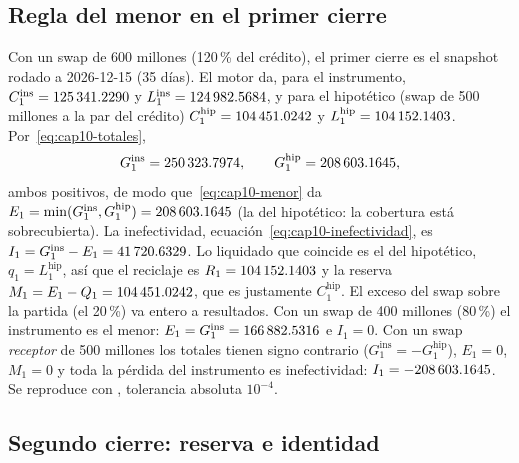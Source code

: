 \subsection{Regla del menor en el primer cierre}

Con un swap de 600 millones (120\,\% del crédito), el primer cierre es el snapshot rodado a 2026-12-15 (35 días). El
motor da, para el instrumento, $C^{\mathrm{ins}}_1=\verif{cap10-inst-cum-1}{125341.2290}$ y
$L^{\mathrm{ins}}_1=\verif{cap10-liq-inst-1}{124982.5684}$, y para el hipotético (swap de 500 millones a la par del
crédito) $C^{\mathrm{hip}}_1=\verif{cap10-hypo-cum-1}{104451.0242}$ y
$L^{\mathrm{hip}}_1=\verif{cap10-liq-hip-1}{104152.1403}$. Por~\eqref{eq:cap10-totales},
\[
  G^{\mathrm{ins}}_1 = \verif{cap10-inst-total}{250323.7974}, \qquad
  G^{\mathrm{hip}}_1 = \verif{cap10-hypo-total}{208603.1645},
\]
ambos positivos, de modo que~\eqref{eq:cap10-menor} da $E_1=\min(G^{\mathrm{ins}}_1,G^{\mathrm{hip}}_1)=
\verif{cap10-efectiva}{208603.1645}$ (la del hipotético: la cobertura está sobrecubierta). La inefectividad,
ecuación~\eqref{eq:cap10-inefectividad}, es $I_1 = G^{\mathrm{ins}}_1 - E_1 = \verif{cap10-inefectividad}{41720.6329}$.
Lo liquidado que coincide es el del hipotético, $q_1 = L^{\mathrm{hip}}_1$, así que el reciclaje es
$R_1=\verif{cap10-reciclaje-1}{104152.1403}$ y la reserva $M_1 = E_1 - Q_1 =
\verif{cap10-reserva-1}{104451.0242}$, que es justamente $C^{\mathrm{hip}}_1$. El exceso del swap sobre la partida
(el 20\,\%) va entero a resultados. Con un swap de 400 millones (80\,\%) el instrumento es el menor:
$E_1=G^{\mathrm{ins}}_1=\verif{cap10-sub-efectiva}{166882.5316}$ e $I_1=0$. Con un swap \emph{receptor} de 500 millones los
totales tienen signo contrario ($G^{\mathrm{ins}}_1=-G^{\mathrm{hip}}_1$), $E_1=0$, $M_1=0$ y toda la pérdida del instrumento es
inefectividad: $I_1=\verif{cap10-opuesto-inefectividad}{-208603.1645}$. Se reproduce con
, tolerancia absoluta $10^{-4}$.

\subsection{Segundo cierre: reserva e identidad}


